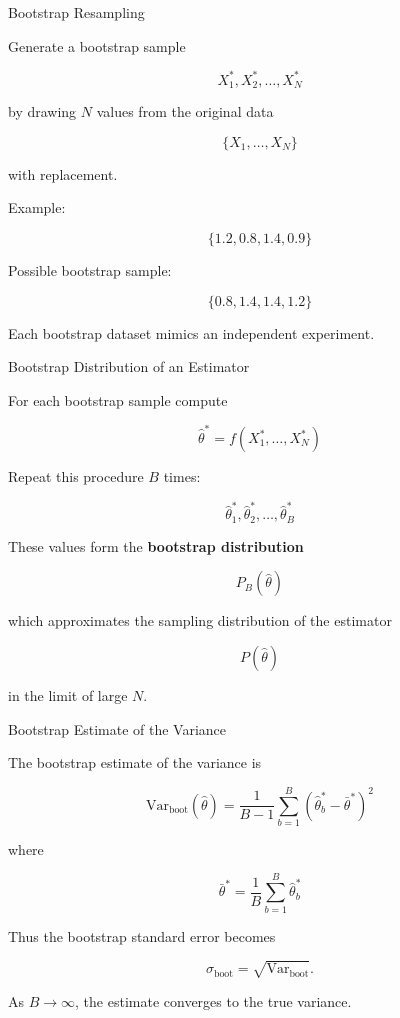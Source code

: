\documentclass{beamer}
\begin{document}

\begin{frame}{Bootstrap Resampling}

Generate a bootstrap sample

\[
X_1^*, X_2^*, \dots, X_N^*
\]

by drawing $N$ values from the original data

\[
\{X_1,\dots,X_N\}
\]

with replacement.

Example:

\[
\{1.2, 0.8, 1.4, 0.9\}
\]

Possible bootstrap sample:

\[
\{0.8,1.4,1.4,1.2\}
\]

Each bootstrap dataset mimics an independent experiment.
\end{frame}


\begin{frame}{Bootstrap Distribution of an Estimator}

For each bootstrap sample compute

\[
\hat{\theta}^* = f(X_1^*,\dots,X_N^*)
\]

Repeat this procedure $B$ times:

\[
\hat{\theta}_1^*, \hat{\theta}_2^*, \dots, \hat{\theta}_B^*
\]

These values form the \textbf{bootstrap distribution}

\[
P_B(\hat{\theta})
\]

which approximates the sampling distribution of the estimator

\[
P(\hat{\theta})
\]

in the limit of large $N$.
\end{frame}


\begin{frame}{Bootstrap Estimate of the Variance}

The bootstrap estimate of the variance is

\[
\mathrm{Var}_{\text{boot}}(\hat{\theta})
=
\frac{1}{B-1}
\sum_{b=1}^{B}
(\hat{\theta}_b^*-\bar{\theta}^*)^2
\]

where

\[
\bar{\theta}^*=
\frac{1}{B}\sum_{b=1}^{B}\hat{\theta}_b^*
\]

Thus the bootstrap standard error becomes

\[
\sigma_{\text{boot}}
=
\sqrt{\mathrm{Var}_{\text{boot}}}.
\]

As $B\to\infty$, the estimate converges to the true variance.
\end{frame}
\end{document}

